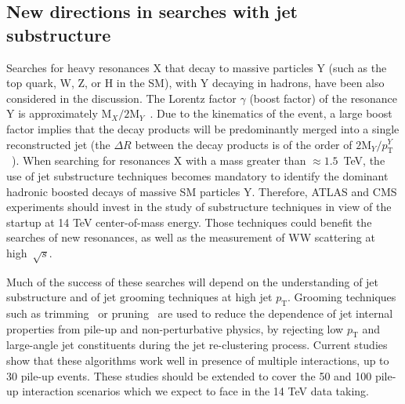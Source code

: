 \documentclass{PoS}
\begin{document}

\subsection{New directions in searches with jet substructure}

Searches for heavy resonances X that decay to massive particles Y 
(such as the top quark, W, Z, or H in the SM), with Y decaying in hadrons, have been also 
considered in the discussion. The Lorentz factor $\gamma$ (boost factor) of the resonance 
Y is approximately $\mbox{M}_{X} / 2 \mbox{M}_{Y}$~\cite{Gouzevitch:2013qca}. 
Due to the kinematics of the event, a large boost factor implies 
that the decay products will be predominantly merged into a single reconstructed jet (the $\Delta R$ between the decay 
products is of the order of $2 \mbox{M}_{Y} / p_\mathrm{T}^{Y}$~\cite{ATLAS-CONF-2012-065}). 
When searching for resonances X with a mass greater than $\approx 1.5$~TeV, 
the use of jet substructure techniques becomes mandatory to identify the dominant
hadronic boosted decays of massive SM particles Y. 
Therefore, ATLAS and CMS experiments should invest 
in the study of substructure techniques in view of the startup at 14 TeV 
center-of-mass energy. Those techniques could benefit the 
searches of new resonances, as well as the measurement of 
WW scattering at high~$\sqrt{s}$. 

Much of the success of these searches will depend on the understanding of jet substructure 
and of jet grooming techniques at high jet $p_\mathrm{T}$. Grooming techniques such as trimming~\cite{Trimming}
or pruning~\cite{Ellis:2009me,Ellis:2009su} 
are used to reduce the dependence of jet 
internal properties from pile-up and non-perturbative physics, by rejecting low $p_\mathrm{T}$ 
and large-angle jet constituents during the jet re-clustering process.
Current studies~\cite{ATLAS-CONF-2012-066} show that these algorithms work well in 
presence of multiple interactions, up to 30 pile-up events. 
These studies should be extended to cover the 50 and 100 pile-up 
interaction scenarios which we expect to face in the 
14 TeV data taking.
\end{document}
